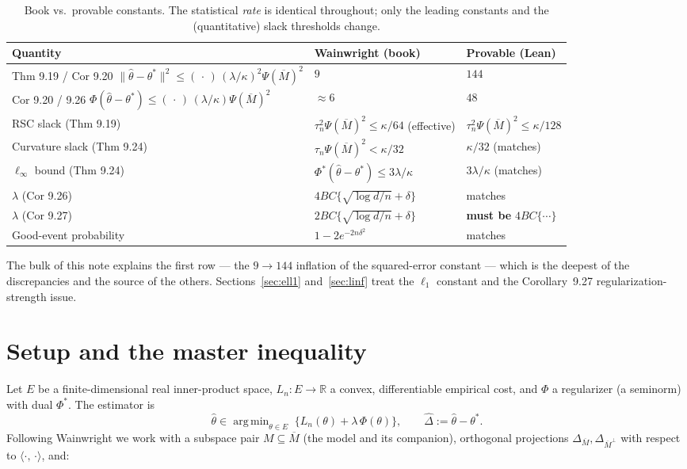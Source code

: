 \documentclass[11pt]{article}
\theoremstyle{definition}
\DeclareMathOperator*{\argmin}{arg\,min}
\newcommand{\R}{\mathbb{R}}
\newcommand{\Ln}{L_n}
\newcommand{\thetast}{\theta^{*}}
\newcommand{\Mbar}{\overline{M}}
\newcommand{\Mbarperp}{\overline{M}^{\perp}}
\newcommand{\Phid}{\Phi^{*}}
\newcommand{\PsM}{\Psi(\Mbar)}
\newcommand{\norm}[1]{\lVert #1 \rVert}
\newcommand{\ip}[2]{\langle #1,\, #2 \rangle}
\begin{document}
\begin{table}[h]
\centering
\renewcommand{\arraystretch}{1.25}
\begin{tabular}{@{}lll@{}}
\toprule
Quantity & Wainwright (book) & Provable (Lean) \\
\midrule
Thm 9.19 / Cor 9.20 \quad $\norm{\widehat\theta-\thetast}^2 \le (\,\cdot\,)\,(\lambda/\kappa)^2\PsM^2$
 & $9$ & $144$ \\
Cor 9.20 / 9.26 \quad $\Phi(\widehat\theta-\thetast) \le (\,\cdot\,)\,(\lambda/\kappa)\PsM^2$
 & $\approx 6$ & $48$ \\
RSC slack (Thm 9.19) & $\tau_n^2\PsM^2 \le \kappa/64$ (effective) & $\tau_n^2\PsM^2 \le \kappa/128$ \\
Curvature slack (Thm 9.24) & $\tau_n\PsM^2 < \kappa/32$ & $\kappa/32$ \;(matches) \\
$\ell_\infty$ bound (Thm 9.24) & $\Phid(\widehat\theta-\thetast)\le 3\lambda/\kappa$ & $3\lambda/\kappa$ \;(matches) \\
$\lambda$ (Cor 9.26) & $4BC\{\sqrt{\log d/n}+\delta\}$ & matches \\
$\lambda$ (Cor 9.27) & $2BC\{\sqrt{\log d/n}+\delta\}$ & \textbf{must be} $4BC\{\cdots\}$ \\
Good-event probability & $1-2e^{-2n\delta^2}$ & matches \\
\bottomrule
\end{tabular}
\caption{Book vs.\ provable constants. The statistical \emph{rate} is identical throughout; only the
leading constants and the (quantitative) slack thresholds change.}
\label{tab:summary}
\end{table}

The bulk of this note explains the first row --- the $9\to144$ inflation of the squared-error
constant --- which is the deepest of the discrepancies and the source of the others. Sections~\ref{sec:ell1}
and~\ref{sec:linf} treat the $\ell_1$ constant and the Corollary~9.27 regularization-strength issue.

\section{Setup and the master inequality}\label{sec:setup}

Let $E$ be a finite-dimensional real inner-product space, $\Ln:E\to\R$ a convex, differentiable
empirical cost, and $\Phi$ a regularizer (a seminorm) with dual $\Phid$. The estimator is
\[
  \widehat\theta \in \argmin_{\theta\in E}\;\big\{\Ln(\theta) + \lambda\,\Phi(\theta)\big\},
  \qquad \widehat\Delta := \widehat\theta-\thetast .
\]
Following Wainwright we work with a subspace pair $M\subseteq\Mbar$ (the model and its companion),
orthogonal projections $\Delta_{\Mbar},\Delta_{\Mbarperp}$ with respect to $\ip{\cdot}{\cdot}$, and:
\end{document}
